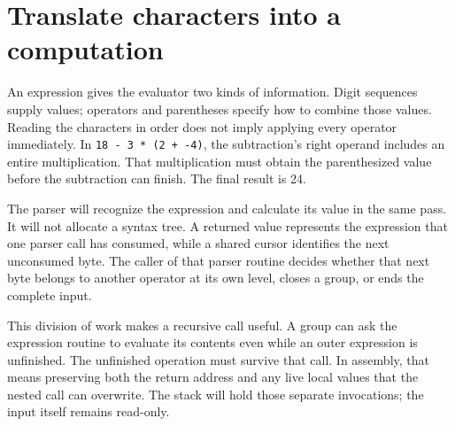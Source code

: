 \section{Translate characters into a computation}\label{expression-purpose}
An expression gives the evaluator two kinds of information. Digit sequences supply
values; operators and parentheses specify how to combine those values. Reading the
characters in order does not imply applying every operator immediately. In
\texttt{18 - 3 * (2 + -4)}, the subtraction's right operand includes an entire
multiplication. That multiplication must obtain the parenthesized value before the
subtraction can finish. The final result is 24.

The parser will recognize the expression and calculate its value in the same pass.
It will not allocate a syntax tree. A returned value represents the expression that
one parser call has consumed, while a shared cursor identifies the next unconsumed
byte. The caller of that parser routine decides whether that next byte belongs to
another operator at its own level, closes a group, or ends the complete input.

This division of work makes a recursive call useful. A group can ask the expression
routine to evaluate its contents even while an outer expression is unfinished.
The unfinished operation must survive that call. In assembly, that means preserving
both the return address and any live local values that the nested call can overwrite.
The stack will hold those separate invocations; the input itself remains read-only.
